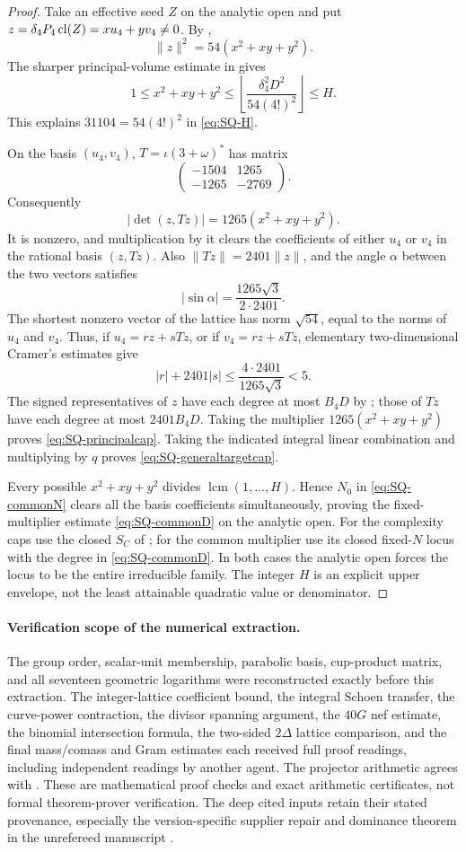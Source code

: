 \begin{proof}
Take an effective seed $Z$ on the analytic open and put $z=\delta_4P_4\operatorname{cl}(Z)=xu_4+yv_4\ne0$. By ,
\[
 \|z\|^2=54(x^2+xy+y^2).
\]
The sharper principal-volume estimate in  gives
\[
 1\le x^2+xy+y^2\le
       \left\lfloor\frac{\delta_4^2D^2}{54(4!)^2}\right\rfloor\le H.
\]
This explains $31104=54(4!)^2$ in \eqref{eq:SQ-H}.

On the basis $(u_4,v_4)$, $T=\iota(3+\omega)^*$ has matrix
\[
 \begin{pmatrix}-1504&1265\\-1265&-2769\end{pmatrix}.
\]
Consequently
\[
 |\det(z,Tz)|=1265(x^2+xy+y^2).
\]
It is nonzero, and multiplication by it clears the coefficients of either $u_4$ or $v_4$ in the rational basis $(z,Tz)$. Also $\|Tz\|=2401\|z\|$, and the angle $\alpha$ between the two vectors satisfies
\[
 |\sin\alpha|=\frac{1265\sqrt3}{2\cdot2401}.
\]
The shortest nonzero vector of the lattice has norm $\sqrt{54}$, equal to the norms of $u_4$ and $v_4$. Thus, if $u_4=rz+sTz$, or if $v_4=rz+sTz$, elementary two-dimensional Cramer's estimates give
\[
 |r|+2401|s|
 \le\frac{4\cdot2401}{1265\sqrt3}<5.
\]
The signed representatives of $z$ have each degree at most $B_4D$ by ; those of $Tz$ have each degree at most $2401B_4D$. Taking the multiplier $1265(x^2+xy+y^2)$ proves \eqref{eq:SQ-principalcap}. Taking the indicated integral linear combination and multiplying by $q$ proves \eqref{eq:SQ-generaltargetcap}.

Every possible $x^2+xy+y^2$ divides $\operatorname{lcm}(1,\ldots,H)$. Hence $N_0$ in \eqref{eq:SQ-commonN} clears all the basis coefficients simultaneously, proving the fixed-multiplier estimate \eqref{eq:SQ-commonD} on the analytic open. For the complexity caps use the closed $S_C$ of ; for the common multiplier use its closed fixed-$N$ locus with the degree in \eqref{eq:SQ-commonD}. In both cases the analytic open forces the locus to be the entire irreducible family. The integer $H$ is an explicit upper envelope, not the least attainable quadratic value or denominator.
\end{proof}

\paragraph{Verification scope of the numerical extraction.}
The group order, scalar-unit membership, parabolic basis, cup-product matrix, and all seventeen geometric logarithms were reconstructed exactly before this extraction. The integer-lattice coefficient bound, the integral Schoen transfer, the curve-power contraction, the divisor spanning argument, the $40G$ nef estimate, the binomial intersection formula, the two-sided $2\Delta$ lattice comparison, and the final mass/comass and Gram estimates each received full proof readings, including independent readings by another agent. The projector arithmetic agrees with . These are mathematical proof checks and exact arithmetic certificates, not formal theorem-prover verification. The deep cited inputs retain their stated provenance, especially the version-specific supplier repair and dominance theorem in the unrefereed manuscript \citet{Severn26}.

